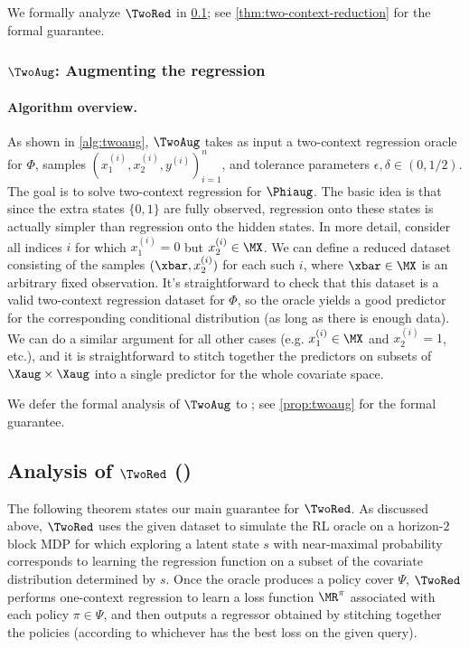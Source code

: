 We formally analyze $\TwoRed$ in \cref{sec:twored}; see \cref{thm:two-context-reduction} for the formal guarantee.

\subsubsection{$\TwoAug$: Augmenting the regression}

\paragraph{Algorithm overview.} As shown in \cref{alg:twoaug}, $\TwoAug$ takes as input a two-context regression oracle for $\Phi$, samples $(x_1^{(i)},x_2^{(i)},y^{(i)})_{i=1}^n$, and tolerance parameters $\epsilon,\delta\in(0,1/2).$ The goal is to solve two-context regression for $\Phiaug$. The basic idea is that since the extra states $\{0,1\}$ are fully observed, regression onto these states is actually simpler than regression onto the hidden states. In more detail, consider all indices $i$ for which $x_1^{(i)} = 0$ but $x_2^{(i)} \in \MX$. We can define a reduced dataset consisting of the samples $(\xbar, x_2^{(i)})$ for each such $i$, where $\xbar\in\MX$ is an arbitrary fixed observation. It's straightforward to check that this dataset is a valid two-context regression dataset for $\Phi$, so the oracle yields a good predictor for the corresponding conditional distribution (as long as there is enough data). We can do a similar argument for all other cases (e.g. $x_1^{(i)} \in \MX$ and $x_2^{(i)} = 1$, etc.), and it is straightforward to stitch together the predictors on subsets of $\Xaug\times\Xaug$ into a single predictor for the whole covariate space.

We defer the formal analysis of $\TwoAug$ to ; see \cref{prop:twoaug} for the formal guarantee.

\subsection{Analysis of $\TwoRed$ ()}\label{sec:twored}

The following theorem states our main guarantee for $\TwoRed$. As discussed above, $\TwoRed$ uses the given dataset to simulate the RL oracle on a horizon-$2$ block MDP for which exploring a latent state $s$ with near-maximal probability corresponds to learning the regression function on a subset of the covariate distribution determined by $s$. Once the oracle produces a policy cover $\Psi$, $\TwoRed$ performs one-context regression to learn a loss function $\MR^\pi$ associated with each policy $\pi \in \Psi$, and then outputs a regressor obtained by stitching together the policies (according to whichever has the best loss on the given query).

